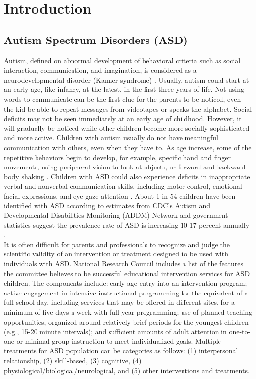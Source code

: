 \chapter{Introduction}

\section{Autism Spectrum Disorders (ASD)}
Autism, defined on abnormal development of behavioral criteria such as
social interaction, communication, and imagination, is considered as a 
neurodevelopmental disorder (Kanner syndrome) \cite{kanner1944early, wing1997autistic}. 
Usually, autism could start at an early age, like infancy, at the latest, in
the first three years of life. Not using words to communicate can be the first
clue for the parents to be noticed, even the kid be able to repeat messages
from videotapes or speaks the alphabet. Social deficits
may not be seen immediately at an early age of childhood. However, it will gradually
be noticed while other children become more socially sophisticated and more
active. Children with autism usually do not have meaningful communication
with others, even when they have to. As age increase, some of the repetitive
behaviors begin to develop, for example, specific hand and finger movements, using
peripheral vision to look at objects, or forward and backward body shaking \cite{lord2000autism}.
Children with ASD could also experience deficits in inappropriate verbal and 
nonverbal communication skills, including motor control, emotional
facial expressions, and eye gaze attention \cite{RobotPlaymate2002}. 
About 1 in 54 children have been identified with ASD
according to estimates from CDC’s Autism and Developmental Disabilities 
Monitoring (ADDM) Network and government statistics suggest the prevalence rate of
ASD is increasing 10-17 percent annually \cite{maenner2020prevalence}. \\

It is often difficult for parents and professionals to recognize and 
judge the scientific validity of an intervention or treatment designed
to be used with individuals with ASD. National Research Council includes 
a list of the features the committee believes to be successful educational 
intervention services for ASD children. The components include: early age 
entry into an intervention program; active engagement in intensive instructional 
programming for the equivalent of a full school day, including services 
that may be offered in different sites, for a minimum of five days a 
week with full-year programming; use of planned teaching opportunities, 
organized around relatively brief periods for the youngest children 
(e.g., 15-20 minute intervals); and sufficient amounts of adult attention 
in one-to-one or minimal group instruction to meet individualized goals. \cite{national2001educating}
Multiple treatments for ASD population can be categories as follows:
(1) interpersonal relationship, (2) skill-based, (3) cognitive,  (4) 
physiological/biological/neurological, and (5) other interventions and 
treatments. \cite{de2004autism} \\

